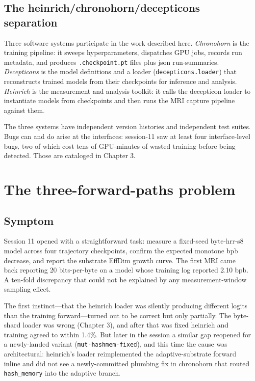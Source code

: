 \documentclass[11pt,openany]{book}
\begin{document}
\section{The heinrich/chronohorn/decepticons separation}

Three software systems participate in the work described here.
\emph{Chronohorn} is the training pipeline: it sweeps hyperparameters,
dispatches GPU jobs, records run metadata, and produces
\texttt{.checkpoint.pt} files plus json run-summaries. \emph{Decepticons}
is the model definitions and a loader (\texttt{decepticons.loader}) that
reconstructs trained models from their checkpoints for inference and
analysis. \emph{Heinrich} is the measurement and analysis toolkit: it
calls the decepticon loader to instantiate models from checkpoints and
then runs the MRI capture pipeline against them.

The three systems have independent version histories and independent
test suites. Bugs can and do arise at the interfaces: session-11 saw
at least four interface-level bugs, two of which cost tens of
GPU-minutes of wasted training before being detected. Those are
cataloged in Chapter 3.

\chapter{The three-forward-paths problem}

\section{Symptom}

Session 11 opened with a straightforward task: measure a fixed-seed
byte-hrr-s8 model across four trajectory checkpoints, confirm the
expected monotone bpb decrease, and report the substrate EffDim growth
curve. The first MRI came back reporting 20 bits-per-byte on a model
whose training log reported 2.10 bpb. A ten-fold discrepancy that
could not be explained by any measurement-window sampling effect.

The first instinct---that the heinrich loader was silently producing
different logits than the training forward---turned out to be correct
but only partially. The byte-shard loader was wrong (Chapter 3), and
after that was fixed heinrich and training agreed to within 1.4\%.
But later in the session a similar gap reopened for a newly-landed
variant (\texttt{mut-hashmem-fixed}), and this time the cause was
architectural: heinrich's loader reimplemented the adaptive-substrate
forward inline and did not see a newly-committed plumbing fix in
chronohorn that routed \texttt{hash\_memory} into the adaptive branch.
\end{document}
